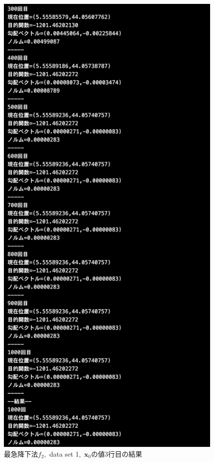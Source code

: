 \documentclass[12pt]{jarticle}
\begin{document}
\begin{figure}[h]
\begin{minipage}{0.5\hsize}
    \end{minipage}
    \begin{minipage}{0.5\hsize}
        \begin{center}
            \includegraphics[scale=0.2]{kadai1_2s_out1_3_3.png}
        \end{center}
    \end{minipage}
    \caption{最急降下法$f_2$,\ data set 1,\ $\boldsymbol{x}_0$の値3行目の結果}
\end{figure}
\end{document}

